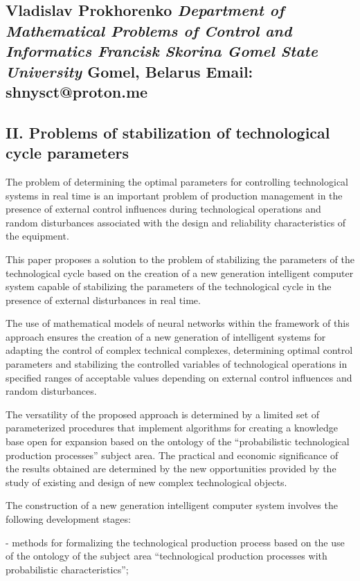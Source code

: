 \documentclass[a4paper,8pt]{article}
\begin{document}
\begin{multicols}{2}
\section*{\centering Vladislav Prokhorenko \textit{Department of Mathematical Problems of Control and Informatics Francisk Skorina Gomel State University} Gomel, Belarus Email: shnysct@proton.me}

\subsection*{\centering II. Problems of stabilization of technological cycle
parameters}

The problem of determining the optimal parameters for controlling technological systems in real time is an important problem of production management in the presence of external control influences during technological operations and random disturbances associated with the design and reliability characteristics of the equipment.

This paper proposes a solution to the problem of stabilizing the parameters of the technological cycle based on the creation of a new generation intelligent computer system capable of stabilizing the parameters of the technological cycle in the presence of external disturbances in real time. 

The use of mathematical models of neural networks within the framework of this approach ensures the creation of a new generation of intelligent systems for adapting the control of complex technical complexes, determining optimal control parameters and stabilizing the controlled variables of technological operations in specified ranges of acceptable values depending on external control influences and random disturbances.

The versatility of the proposed approach is determined by a limited set of parameterized procedures that implement algorithms for creating a knowledge base open for expansion based on the ontology of the “probabilistic technological production processes” subject area. The practical and economic significance of the results obtained are determined by the new opportunities provided by the study of existing and design of new complex technological objects.

The construction of a new generation intelligent computer system involves the following development stages:

- methods for formalizing the technological production process based on the use of the ontology of the subject area “technological production processes with probabilistic characteristics”;

\end{multicols}
\end{document}
